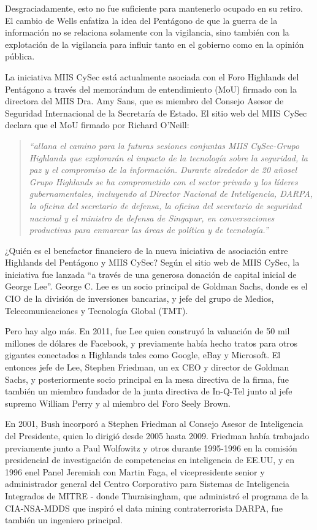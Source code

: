 \documentclass[10pt,a5paper,twoside,spanish,]{book}
\begin{document}
Desgraciadamente, esto no fue suficiente para mantenerlo ocupado en su
retiro. El cambio de Wells enfatiza la idea del Pentágono de que la
guerra de la información no se relaciona solamente con la vigilancia,
sino también con la explotación de la vigilancia para influir tanto en
el gobierno como en la opinión pública.

La iniciativa MIIS CySec está actualmente asociada con el Foro Highlands
del Pentágono a través del memorándum de entendimiento (MoU) firmado con
la directora del MIIS Dra. Amy Sans, que es miembro del Consejo Asesor
de Seguridad Internacional de la Secretaría de Estado. El sitio web del
MIIS CySec declara que el MoU firmado por Richard O'Neill:

\begin{quote}
\emph{``allana el camino para la futuras sesiones conjuntas MIIS
CySec-Grupo Highlands que explorarán el impacto de la tecnología sobre
la seguridad, la paz y el compromiso de la información. Durante
alrededor de 20 añosel Grupo Highlands se ha comprometido con el sector
privado y los líderes gubernamentales, incluyendo al Director Nacional
de Inteligencia, DARPA, la oficina del secretario de defensa, la oficina
del secretario de seguridad nacional y el ministro de defensa de
Singapur, en conversaciones productivas para enmarcar las áreas de
política y de tecnología.''}
\end{quote}

¿Quién es el benefactor financiero de la nueva iniciativa de asociación
entre Highlands del Pentágono y MIIS CySec? Según el sitio web de MIIS
CySec, la iniciativa fue lanzada ``a través de una generosa donación de
capital inicial de George Lee''. George C. Lee es un socio principal de
Goldman Sachs, donde es el CIO de la división de inversiones bancarias,
y jefe del grupo de Medios, Telecomunicaciones y Tecnología Global
(TMT).

Pero hay algo más. En 2011, fue Lee quien construyó la valuación de 50
mil millones de dólares de Facebook, y previamente había hecho tratos
para otros gigantes conectados a Highlands tales como Google, eBay y
Microsoft. El entonces jefe de Lee, Stephen Friedman, un ex CEO y
director de Goldman Sachs, y posteriormente socio principal en la mesa
directiva de la firma, fue también un miembro fundador de la junta
directiva de In-Q-Tel junto al jefe supremo William Perry y al miembro
del Foro Seely Brown.

En 2001, Bush incorporó a Stephen Friedman al Consejo Asesor de
Inteligencia del Presidente, quien lo dirigió desde 2005 hasta 2009.
Friedman había trabajado previamente junto a Paul Wolfowitz y otros
durante 1995-1996 en la comisión presidencial de investigación de
competencias en inteligencia de EE.UU, y en 1996 enel Panel Jeremiah con
Martin Faga, el vicepresidente senior y administrador general del Centro
Corporativo para Sistemas de Inteligencia Integrados de MITRE - donde
Thuraisingham, que administró el programa de la CIA-NSA-MDDS que inspiró
el data mining contraterrorista DARPA, fue también un ingeniero
principal.
\end{document}
